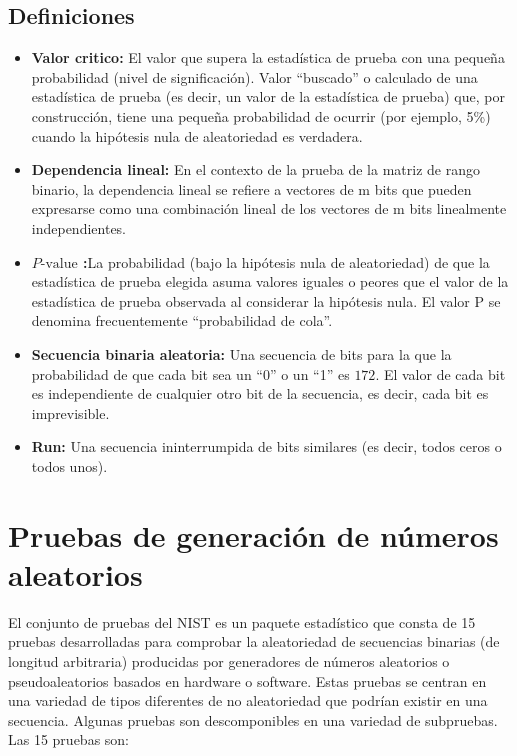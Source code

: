 	\subsection{Definiciones}
	
	\begin{itemize}
		\item \textbf{Valor critico: }El valor que supera la estadística de prueba con una pequeña probabilidad (nivel de significación). Valor ``buscado'' o calculado de una estadística de prueba (es decir, un valor de la estadística de prueba) que, por construcción, tiene una pequeña probabilidad de ocurrir (por ejemplo, 5\%) cuando la hipótesis nula de aleatoriedad es verdadera.
		
		\item \textbf{Dependencia lineal: }En el contexto de la prueba de la matriz de rango binario, la dependencia lineal se refiere a vectores de m bits que pueden expresarse como una combinación lineal de los vectores de m bits linealmente independientes.
		
		\item \textbf{$P\text{-value}$ :}La probabilidad (bajo la hipótesis nula de aleatoriedad) de que la estadística de prueba elegida asuma valores iguales o peores que el valor de la estadística de prueba observada al considerar la hipótesis nula. El valor P se denomina frecuentemente ``probabilidad de cola''.
		
		\item \textbf{Secuencia binaria aleatoria: }Una secuencia de bits para la que la probabilidad de que cada bit sea un ``0'' o un ``1'' es $172$. El valor de cada bit es independiente de cualquier otro bit de la secuencia, es decir, cada bit es imprevisible.
		
		\item \textbf{Run: }Una secuencia ininterrumpida de bits similares (es decir, todos ceros o todos unos).
	\end{itemize}
	
	\section{Pruebas de generación de números aleatorios}
	
	El conjunto de pruebas del NIST es un paquete estadístico que consta de 15 pruebas desarrolladas para comprobar la aleatoriedad de secuencias binarias (de longitud arbitraria) producidas por generadores de números aleatorios o pseudoaleatorios basados en hardware o software. Estas pruebas se centran en una variedad de tipos diferentes de no aleatoriedad que podrían existir en una secuencia. Algunas pruebas son descomponibles en una variedad de subpruebas. Las 15 pruebas son:

